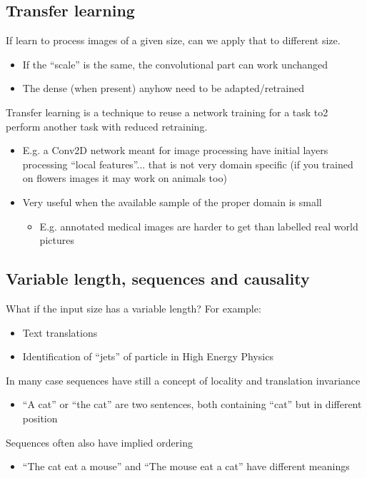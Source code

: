 \subsection{Transfer learning}
If learn to process images of a given size, can we apply that to different size.
\begin{itemize}
	\item If the “scale” is the same, the convolutional part can work unchanged
	\item The dense (when present) anyhow need to be adapted/retrained
\end{itemize}

Transfer learning is a technique to reuse a network training for a task to2 perform another task with reduced retraining.
\begin{itemize}
	\item E.g. a Conv2D network meant for image
	processing have initial layers processing “local
	features”... that is not very domain specific (if
	you trained on flowers images it may work on
	animals too)
	\item Very useful when the available sample of the proper domain is small
	\begin{itemize}
		\item E.g. annotated medical images are
		harder to get than labelled real world
		pictures
	\end{itemize}
\end{itemize}


\subsection{Variable length, sequences and causality}

What if the input size has a variable length? For example:
\begin{itemize}
	\item Text translations
	\item Identification of “jets” of particle in High Energy Physics
\end{itemize}
In many case sequences have still a concept of locality and translation invariance
\begin{itemize}
	\item “A cat” or “the cat” are two sentences, both containing “cat” but in different position
\end{itemize}
Sequences often also have implied ordering
\begin{itemize}
	\item “The cat eat a mouse” and “The mouse eat a cat” have different meanings
\end{itemize}


